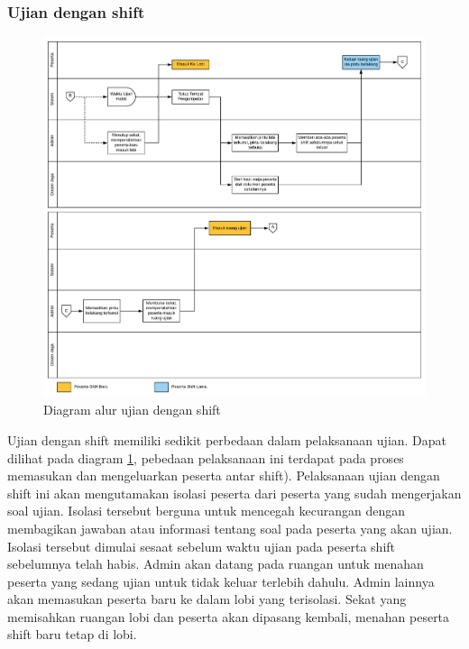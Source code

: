     \subsubsection{Ujian dengan shift}
        \begin{figure}
            \centering
            \includegraphics[width=0.75\paperwidth]{Gambar/flowchart/exam-flow-ujian-shift.pdf}
            \caption{Diagram alur ujian dengan shift}
            \label{fig:flowchart-exam-exam-with-shift}
        \end{figure}
        Ujian dengan shift memiliki sedikit perbedaan dalam pelaksanaan ujian. Dapat dilihat pada diagram \ref{fig:flowchart-exam-exam-with-shift}, pebedaan pelaksanaan ini terdapat pada proses memasukan dan mengeluarkan peserta antar shift). Pelaksanaan ujian dengan shift ini akan mengutamakan isolasi peserta dari peserta yang sudah mengerjakan soal ujian. Isolasi tersebut berguna untuk mencegah kecurangan dengan membagikan jawaban atau informasi tentang soal pada peserta yang akan ujian.
        Isolasi tersebut dimulai sesaat sebelum waktu ujian pada peserta shift sebelumnya telah habis. Admin akan datang pada ruangan untuk menahan peserta yang sedang ujian untuk tidak keluar terlebih dahulu.
        Admin lainnya akan memasukan peserta baru ke dalam lobi yang terisolasi. Sekat yang memisahkan ruangan lobi dan peserta akan dipasang kembali, menahan peserta shift baru tetap di lobi.
        
